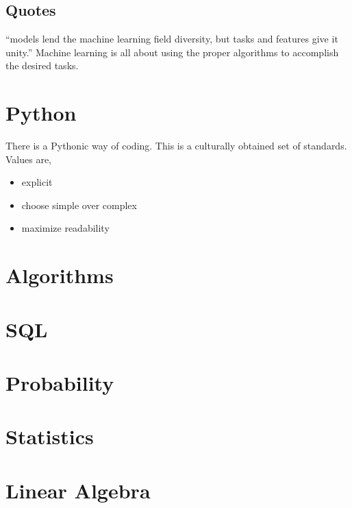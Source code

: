 \documentclass[11pt,letterpaper,oneside]{memoir}
\theoremstyle{definition}
\newtheorem{defn}{Definition}
\begin{document}
\section{Quotes}

``models lend the machine learning field diversity, but tasks and features give it unity.'' \cite[p. 13]{Flach2012}
Machine learning is all about using the proper algorithms to accomplish the desired \glspl{task}.
\begin{comment}
\begin{defn}[Task]
  \label{defn:task}
  An abstract representation of a problem we want to solve regarding the domain objects of import.
\end{defn}
\end{comment}

\chapter{Python}
There is a Pythonic way of coding.  This is a culturally obtained set of standards.  Values are,

\begin{itemize}
  \item explicit
  \item choose simple over complex
  \item maximize readability
\end{itemize}

\chapter{Algorithms}
\chapter{SQL}
\chapter{Probability}
\chapter{Statistics}
\chapter{Linear Algebra}
\printnoidxglossaries


\end{document}
